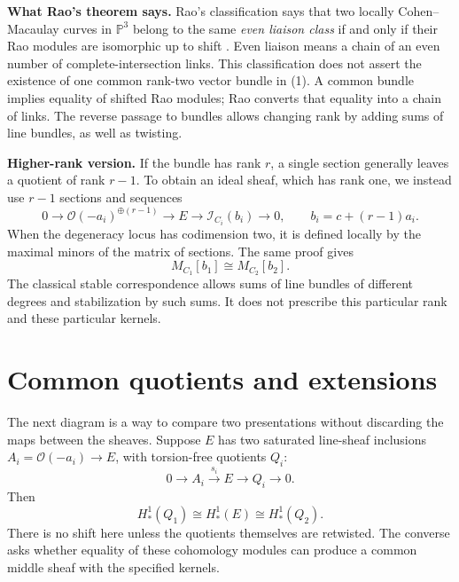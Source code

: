 \documentclass[11pt,a4paper]{article}
\theoremstyle{remark}
\begin{document}
\textbf{What Rao's theorem says.}
Rao's classification says that two
locally Cohen--Macaulay curves in
$\mathbb{P}^3$ belong to the same
\emph{even liaison class} if and only
if their Rao modules are isomorphic
up to shift \cite{rao}.
Even liaison means a chain of an even
number of complete-intersection links.
This classification does not assert
the existence of one common rank-two
vector bundle in (1). A common bundle
implies equality of shifted Rao modules;
Rao converts that equality into a chain
of links. The reverse passage to bundles
allows changing rank by adding sums of
line bundles, as well as twisting.

\textbf{Higher-rank version.}
If the bundle has rank $r$, a single
section generally leaves a quotient of
rank $r-1$. To obtain an ideal sheaf,
which has rank one, we instead use
$r-1$ sections and sequences
$$
0\longrightarrow
\mathcal{O}(-a_i)^{\oplus(r-1)}
\longrightarrow E
\longrightarrow\mathcal{I}_{C_i}(b_i)
\longrightarrow0,
\qquad b_i=c+(r-1)a_i.
$$
When the degeneracy locus has
codimension two, it is defined locally
by the maximal minors of the matrix
of sections. The same proof gives
$$
M_{C_1}[b_1]\cong M_{C_2}[b_2].
$$
The classical stable correspondence
allows sums of line bundles of different
degrees and stabilization by such sums.
It does not prescribe this particular
rank and these particular kernels.

\section{Common quotients and extensions}

The next diagram is a way to compare
two presentations without discarding
the maps between the sheaves.
Suppose $E$ has two
saturated line-sheaf inclusions
$A_i=\mathcal{O}(-a_i)\to E$, with
torsion-free quotients $Q_i$:
\begin{equation}
0\longrightarrow A_i\xrightarrow{s_i}E
\longrightarrow Q_i\longrightarrow0.
\end{equation}
Then
$$
H^1_*(Q_1)\cong H^1_*(E)
\cong H^1_*(Q_2).
$$
There is no shift here unless the
quotients themselves are retwisted.
The converse asks whether equality of
these cohomology modules can produce
a common middle sheaf with the
specified kernels.
\end{document}
